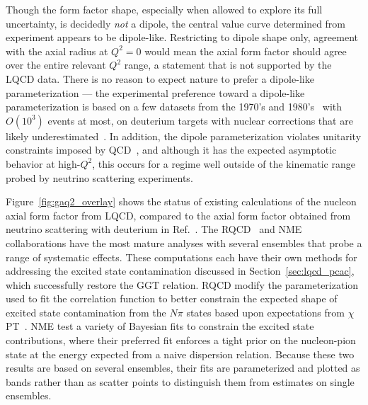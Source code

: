 \documentclass{ar-1col}
\begin{document}
Though the form factor shape, especially when allowed to explore its full uncertainty,
 is decidedly \emph{not} a dipole, the central value curve determined
 from experiment appears to be dipole-like.
Restricting to dipole shape only, agreement with the axial radius at $Q^2=0$
 would mean the axial form factor should agree over the entire relevant $Q^2$ range,
 a statement that is not supported by the LQCD data.
There is no reason to expect nature to prefer a dipole-like parameterization ---
 the experimental preference toward a dipole-like parameterization is based on
 a few datasets from the 1970's and 1980's~\cite{ANL_Barish_1977, BNL_Baker_1981, Kitagaki:1983px}
 with $O(10^3)$ events at most,
 on deuterium targets with nuclear corrections that are likely underestimated~\cite{Meyer:2016oeg}.
In addition, the dipole parameterization violates
 unitarity constraints imposed by QCD~\cite{Bhattacharya:2011ah},
 and although it has the expected asymptotic behavior at high-$Q^2$,
 this occurs for a regime well outside of the kinematic range probed
 by neutrino scattering experiments.



Figure~\ref{fig:gaq2_overlay} shows the status of existing calculations of
 the nucleon axial form factor from LQCD,
 compared to the axial form factor obtained from neutrino scattering
 with deuterium in Ref.~\cite{Meyer:2016oeg}.
The RQCD~\cite{RQCD:2019jai} and NME~\cite{Park:2021ypf} collaborations
 have the most mature analyses with several ensembles that probe a range of
 systematic effects.
These computations each have their own methods for addressing the
 excited state contamination discussed in Section~\ref{sec:lqcd_pcac},
 which successfully restore the GGT relation.
RQCD modify the parameterization used to fit the correlation function
 to better constrain the expected shape of excited state contamination from the $N\pi$ states based upon expectations from $\chi$PT~\cite{Bar:2018xyi}.
NME test a variety of Bayesian fits to constrain the excited state contributions,
 where their preferred fit enforces a tight prior on the nucleon-pion state
 at the energy expected from a naive dispersion relation.
Because these two results are based on several ensembles,
 their fits are parameterized and plotted as bands rather than as scatter points
 to distinguish them from estimates on single ensembles.
\end{document}
